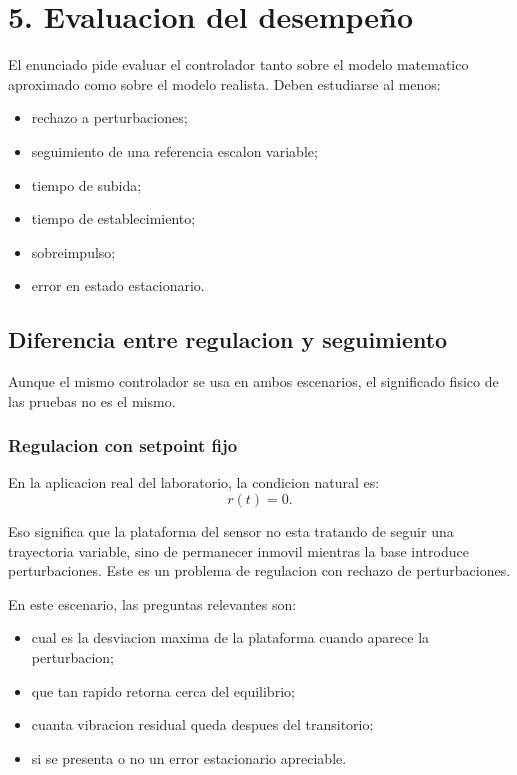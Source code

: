\documentclass[11pt]{article}
\begin{document}
\section{5. Evaluacion del desempe\~no}

El enunciado pide evaluar el controlador tanto sobre el modelo matematico aproximado como sobre el modelo realista. Deben estudiarse al menos:

\begin{itemize}[leftmargin=1.2cm]
\item rechazo a perturbaciones;
\item seguimiento de una referencia escalon variable;
\item tiempo de subida;
\item tiempo de establecimiento;
\item sobreimpulso;
\item error en estado estacionario.
\end{itemize}

\subsection{Diferencia entre regulacion y seguimiento}

Aunque el mismo controlador se usa en ambos escenarios, el significado fisico de las pruebas no es el mismo.

\subsubsection{Regulacion con setpoint fijo}

En la aplicacion real del laboratorio, la condicion natural es:
\[
r(t)=0.
\]

Eso significa que la plataforma del sensor no esta tratando de seguir una trayectoria variable, sino de permanecer inmovil mientras la base introduce perturbaciones. Este es un problema de regulacion con rechazo de perturbaciones.

En este escenario, las preguntas relevantes son:

\begin{itemize}[leftmargin=1.2cm]
\item cual es la desviacion maxima de la plataforma cuando aparece la perturbacion;
\item que tan rapido retorna cerca del equilibrio;
\item cuanta vibracion residual queda despues del transitorio;
\item si se presenta o no un error estacionario apreciable.
\end{itemize}
\end{document}
